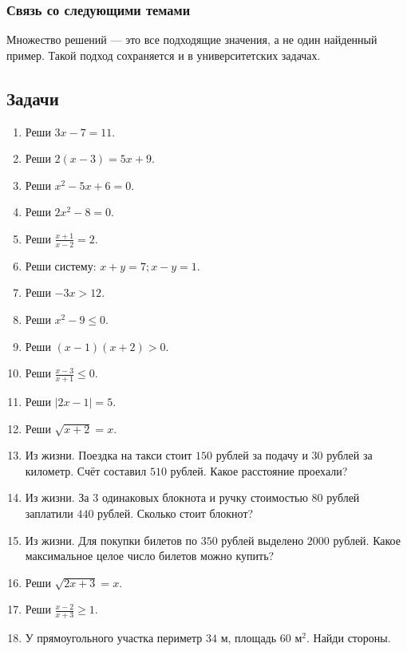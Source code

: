 \documentclass[12pt,a4paper]{article}
\theoremstyle{definition}
\theoremstyle{plain}
\theoremstyle{remark}
\newcommand{\starmark}{\ensuremath{{}^{\ast}}}
\begin{document}
\subsubsection*{Связь со следующими темами}
Множество решений — это все подходящие значения, а не один найденный пример. Такой подход сохраняется и в университетских задачах.
\subsection*{Задачи}
\begin{enumerate}[label=\thesection.\arabic*.,leftmargin=2.8em,itemsep=12pt]
\item Реши \(3 x - 7 = 11\).
\item Реши \(2 (x - 3) = 5 x + 9\).
\item Реши \(x^{2} - 5 x + 6 = 0\).
\item Реши \(2 x^{2} - 8 = 0\).
\item Реши \(\frac{x + 1}{x - 2} = 2\).
\item Реши систему: \(x + y = 7;\allowbreak x - y = 1\).
\item Реши \(- 3 x > 12\).
\item Реши \(x^{2} - 9 \le  0\).
\item Реши \((x - 1) (x + 2) > 0\).
\item Реши \(\frac{x - 3}{x + 1} \le  0\).
\item Реши \(| 2 x - 1 | = 5\).
\item Реши \(\sqrt{x + 2} = x\).
\item Из жизни. Поездка на такси стоит \(150\) рублей за подачу и \(30\) рублей за километр. Счёт составил \(510\) рублей. Какое расстояние проехали?
\item Из жизни. За \(3\) одинаковых блокнота и ручку стоимостью \(80\) рублей заплатили \(440\) рублей. Сколько стоит блокнот?
\item Из жизни. Для покупки билетов по \(350\) рублей выделено \(2000\) рублей. Какое максимальное целое число билетов можно купить?
\item[\textbf{10.16.}\starmark] Реши \(\sqrt{2 x + 3} = x\).
\item[\textbf{10.17.}\starmark] Реши \(\frac{x - 2}{x + 3} \ge  1\).
\item[\textbf{10.18.}\starmark] У прямоугольного участка периметр \(34\) м, площадь \(60\) м\(^{2}\). Найди стороны.
\end{enumerate}
\clearpage
\end{document}
